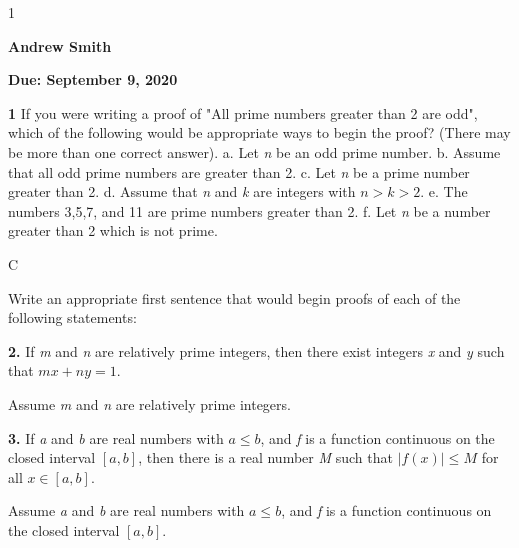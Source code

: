 \documentclass[12pt]{article}
\newcommand{\duedate}{September 9, 2020}
\newcommand{\yourname}{Andrew Smith}
\def\printsolutions{1}
\begin{document}
\if\printsolutions1
\begin{center}
\textbf{\Large \yourname}
\end{center}
\else
\begin{center}
\textbf{\Large Due: \duedate}
\end{center}
\fi


\begin{problem}\textbf{1}
If you were writing a proof of "All prime numbers greater than 2 are odd", which of the following would be appropriate ways to begin the proof? (There may be more than one correct answer).\newline
\indent a. Let \textit{n} be an odd prime number.\newline
\indent b. Assume that all odd prime numbers are greater than 2.\newline
\indent c. Let \textit{n} be a prime number greater than 2.\newline
\indent d. Assume that \textit{n} and \textit{k} are integers with $n>k>2$.\newline
\indent e. The numbers 3,5,7, and 11 are prime numbers greater than 2.\newline
\indent f. Let \textit{n} be a number greater than 2 which is not prime.
\end{problem}
\begin{solution}\newline
C
\end{solution}
\begin{problem}
Write an appropriate first sentence that would begin proofs of each of the following statements:
\end{problem}
\begin{subproblem}\textbf{2.} If \textit{m} and \textit{n} are relatively prime integers, then there exist integers \textit{x} and \textit{y} such that $mx+ny=1$.
\end{subproblem}
\begin{solution}
Assume \textit{m} and \textit{n} are relatively prime integers.
\end{solution}
\begin{subproblem}\textbf{3.}
If \textit{a} and \textit{b} are real numbers with $a\leq b$, and \textit{f} is a function continuous on the closed interval $[a,b]$, then there is a real number \textit{M} such that $|f(x)|\leq M$ for all $x\in [a,b]$.
\end{subproblem}
\begin{solution}
Assume \textit{a} and \textit{b} are real numbers with $a\leq b$, and \textit{f} is a function continuous on the closed interval $[a,b]$.
\end{solution}
\end{document}
